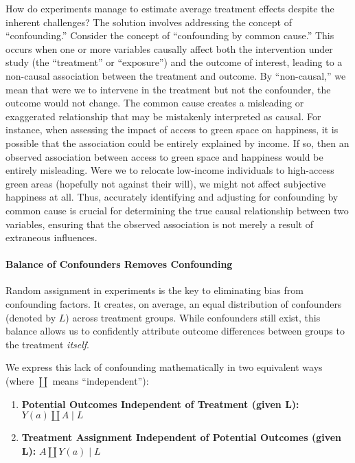 \documentclass[
  singlecolumn]{article}
\let\oldparagraph\paragraph
\renewcommand{\paragraph}[1]{\oldparagraph{#1}\mbox{}}
\providecommand{\tightlist}{%
  \setlength{\itemsep}{0pt}\setlength{\parskip}{0pt}}\usepackage{longtable,booktabs,array}
\begin{document}
How do experiments manage to estimate average treatment effects despite
the inherent challenges? The solution involves addressing the concept of
``confounding.'' Consider the concept of ``confounding by common
cause.'' This occurs when one or more variables causally affect both the
intervention under study (the ``treatment'' or ``exposure'') and the
outcome of interest, leading to a non-causal association between the
treatment and outcome. By ``non-causal,'' we mean that were we to
intervene in the treatment but not the confounder, the outcome would not
change. The common cause creates a misleading or exaggerated
relationship that may be mistakenly interpreted as causal. For instance,
when assessing the impact of access to green space on happiness, it is
possible that the association could be entirely explained by income. If
so, then an observed association between access to green space and
happiness would be entirely misleading. Were we to relocate low-income
individuals to high-access green areas (hopefully not against their
will), we might not affect subjective happiness at all. Thus, accurately
identifying and adjusting for confounding by common cause is crucial for
determining the true causal relationship between two variables, ensuring
that the observed association is not merely a result of extraneous
influences.

\paragraph{Balance of Confounders Removes
Confounding}\label{balance-of-confounders-removes-confounding}

Random assignment in experiments is the key to eliminating bias from
confounding factors. It creates, on average, an equal distribution of
confounders (denoted by \(L\)) across treatment groups. While
confounders still exist, this balance allows us to confidently attribute
outcome differences between groups to the treatment \emph{itself}.

We express this lack of confounding mathematically in two equivalent
ways (where \(\coprod\) means ``independent''):

\begin{enumerate}
\def\labelenumi{\arabic{enumi}.}
\tightlist
\item
  \textbf{Potential Outcomes Independent of Treatment (given L):}
  \(Y(a) \coprod A \mid L\)
\item
  \textbf{Treatment Assignment Independent of Potential Outcomes (given
  L):} \(A \coprod Y(a) \mid L\)
\end{enumerate}
\end{document}
